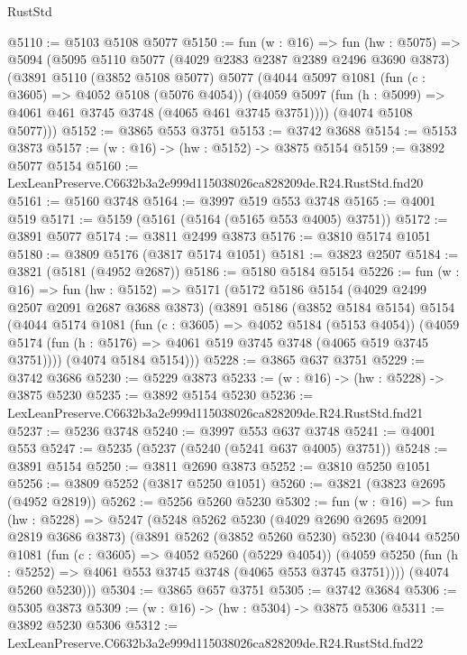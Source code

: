\begin{lexlean}{RustStd}
\begin{coremodule}
@5110 := @5103 @5108 @5077
@5150 := fun (w : @16) =>
  fun (hw : @5075) =>
  @5094
    (@5095
      @5110
      @5077
      (@4029 @2383 @2387 @2389 @2496 @3690 @3873)
      (@3891
        @5110
        (@3852 @5108 @5077)
        @5077
        (@4044
          @5097
          @1081
          (fun (c : @3605) => @4052 @5108 (@5076 @4054))
          (@4059 @5097 (fun (h : @5099) => @4061 @461 @3745 @3748 (@4065 @461 @3745 @3751))))
        (@4074 @5108 @5077)))
@5152 := @3865 @553 @3751
@5153 := @3742 @3688
@5154 := @5153 @3873
@5157 := (w : @16) -> (hw : @5152) -> @3875 @5154
@5159 := @3892 @5077 @5154
@5160 := LexLeanPreserve.C6632b3a2e999d115038026ca828209de.R24.RustStd.fnd20
@5161 := @5160 @3748
@5164 := @3997 @519 @553 @3748
@5165 := @4001 @519
@5171 := @5159 (@5161 (@5164 (@5165 @553 @4005) @3751))
@5172 := @3891 @5077
@5174 := @3811 @2499 @3873
@5176 := @3810 @5174 @1051
@5180 := @3809 @5176 (@3817 @5174 @1051)
@5181 := @3823 @2507
@5184 := @3821 (@5181 (@4952 @2687))
@5186 := @5180 @5184 @5154
@5226 := fun (w : @16) =>
  fun (hw : @5152) =>
  @5171
    (@5172
      @5186
      @5154
      (@4029 @2499 @2507 @2091 @2687 @3688 @3873)
      (@3891
        @5186
        (@3852 @5184 @5154)
        @5154
        (@4044
          @5174
          @1081
          (fun (c : @3605) => @4052 @5184 (@5153 @4054))
          (@4059 @5174 (fun (h : @5176) => @4061 @519 @3745 @3748 (@4065 @519 @3745 @3751))))
        (@4074 @5184 @5154)))
@5228 := @3865 @637 @3751
@5229 := @3742 @3686
@5230 := @5229 @3873
@5233 := (w : @16) -> (hw : @5228) -> @3875 @5230
@5235 := @3892 @5154 @5230
@5236 := LexLeanPreserve.C6632b3a2e999d115038026ca828209de.R24.RustStd.fnd21
@5237 := @5236 @3748
@5240 := @3997 @553 @637 @3748
@5241 := @4001 @553
@5247 := @5235 (@5237 (@5240 (@5241 @637 @4005) @3751))
@5248 := @3891 @5154
@5250 := @3811 @2690 @3873
@5252 := @3810 @5250 @1051
@5256 := @3809 @5252 (@3817 @5250 @1051)
@5260 := @3821 (@3823 @2695 (@4952 @2819))
@5262 := @5256 @5260 @5230
@5302 := fun (w : @16) =>
  fun (hw : @5228) =>
  @5247
    (@5248
      @5262
      @5230
      (@4029 @2690 @2695 @2091 @2819 @3686 @3873)
      (@3891
        @5262
        (@3852 @5260 @5230)
        @5230
        (@4044
          @5250
          @1081
          (fun (c : @3605) => @4052 @5260 (@5229 @4054))
          (@4059 @5250 (fun (h : @5252) => @4061 @553 @3745 @3748 (@4065 @553 @3745 @3751))))
        (@4074 @5260 @5230)))
@5304 := @3865 @657 @3751
@5305 := @3742 @3684
@5306 := @5305 @3873
@5309 := (w : @16) -> (hw : @5304) -> @3875 @5306
@5311 := @3892 @5230 @5306
@5312 := LexLeanPreserve.C6632b3a2e999d115038026ca828209de.R24.RustStd.fnd22

\end{coremodule}
\end{lexlean}
